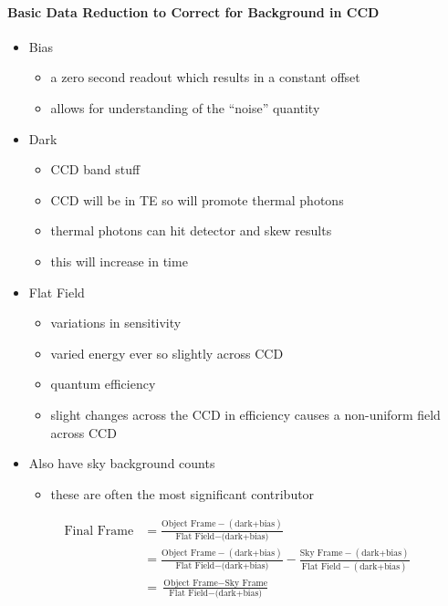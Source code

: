 \documentclass[a4paper,11pt,normalem]{article}
\begin{document}
\paragraph{Basic Data Reduction to Correct for Background in
CCD}
\begin{itemize}
    \item Bias
        \begin{itemize}
            \item a zero second readout which results in a constant offset
            \item allows for understanding of the ``noise'' quantity
        \end{itemize}
    \item Dark
        \begin{itemize}
            \item CCD band stuff
            \item CCD will be in TE so will promote thermal photons
            \item thermal photons can hit detector and skew results
            \item this will increase in time
        \end{itemize}
    \item Flat Field
        \begin{itemize}
            \item variations in sensitivity
            \item varied energy ever so slightly across CCD
            \item quantum efficiency
            \item slight changes across the CCD in efficiency causes a non-uniform field across CCD
        \end{itemize}
    \item Also have sky background counts
        \begin{itemize}
            \item these are often the most significant contributor
        \end{itemize}
\end{itemize}
\begin{align*}
    \text{Final Frame} &= \frac{\text{Object Frame} - (\text{dark+bias})}{\text{Flat Field} - \text{(dark+bias)}} \\
                       &= \frac{\text{Object Frame} - (\text{dark+bias})}{\text{Flat Field} - \text{(dark+bias)}} - \frac{\text{Sky Frame} - (\text{dark+bias})}{\text{Flat Field} - (\text{dark+bias})} \\
                       &= \frac{\text{Object Frame} - \text{Sky Frame}}{\text{Flat Field} - \text{(dark+bias)}}
\end{align*}
\end{document}
